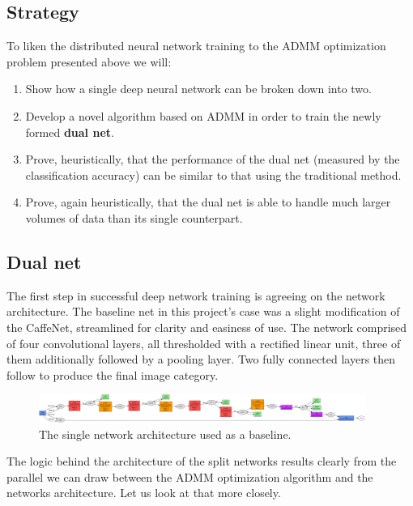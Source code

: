 \documentclass[a4paper, 12pt]{article}
\numberwithin{equation}{section}
\begin{document}
	\subsection{Strategy}
	
	To liken the distributed neural network training to the ADMM optimization problem presented above we will:
	\begin{enumerate}
		\item Show how a single deep neural network can be broken down into two.
		\item Develop a novel algorithm based on ADMM in order to train the newly formed \textbf{dual net}.
		\item Prove, heuristically, that the performance of the dual net (measured by the classification accuracy) can be similar to that using the traditional method.
		\item Prove, again heuristically, that the dual net is able to handle much larger volumes of data than its single counterpart.
	\end{enumerate}
	
	\subsection{Dual net}
	
	The first step in successful deep network training is agreeing on the network architecture. The baseline net in this project's case was a slight modification of the CaffeNet, streamlined for clarity and easiness of use. The network comprised of four convolutional layers, all thresholded with a rectified linear unit, three of them additionally followed by a pooling layer. Two fully connected layers then follow to produce the final image category.
	
	\begin{figure}[!h]
		\centering
		\includegraphics[page=1,width=0.95\textwidth]{net12.png}
		\caption{\label{fig:net12}{The single network architecture used as a baseline.}}
	\end{figure}
	
	The logic behind the architecture of the split networks results clearly from the parallel we can draw between the ADMM optimization algorithm and the networks architecture. Let us look at that more closely.
	
\end{document}

